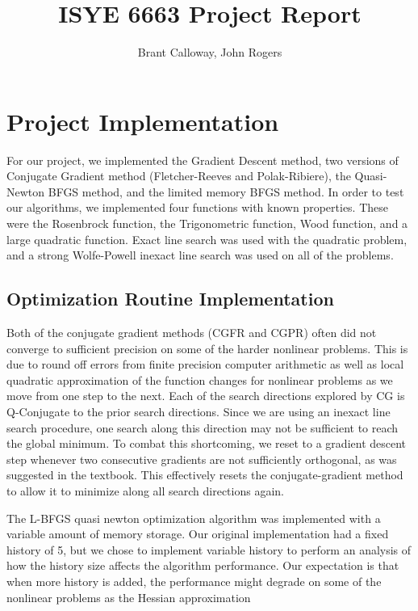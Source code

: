 \documentclass[12pt]{amsart}
\title{ISYE 6663 Project Report}
\author{Brant Calloway, John Rogers}
\date{} %
\begin{document}
\maketitle

\section{Project Implementation}
For our project, we implemented the Gradient Descent method, two versions of Conjugate Gradient method (Fletcher-Reeves and Polak-Ribiere), the Quasi-Newton BFGS method, and the limited memory BFGS method. In order to test our algorithms, we implemented four functions with known properties.  These were the Rosenbrock function, the Trigonometric function, Wood function, and a large quadratic function.  Exact line search was used with the quadratic problem, and a strong Wolfe-Powell inexact line search was used on all of the problems.  

\subsection{Optimization Routine Implementation}

Both of the conjugate gradient methods (CGFR and CGPR) often did not converge to sufficient precision on some of the harder nonlinear problems.  This is due to round off errors from finite precision computer arithmetic as well as local quadratic approximation of the function changes for nonlinear problems as we move from one step to the next.  Each of the search directions explored by CG is Q-Conjugate to the prior search directions.  Since we are using an inexact line search procedure, one search along this direction may not be sufficient to reach the global minimum.  To combat this shortcoming, we reset to a gradient descent step whenever two consecutive gradients are not sufficiently orthogonal, as was suggested in the textbook.  This effectively resets the conjugate-gradient method to allow it to minimize along all search directions again.

The L-BFGS quasi newton optimization algorithm was implemented with a variable amount of memory storage.  Our original implementation had a fixed history of 5, but we chose to implement variable history to perform an analysis of how the history size affects the algorithm performance.  Our expectation is that when more history is added, the performance might degrade on some of the nonlinear problems as the Hessian approximation 
\end{document}
